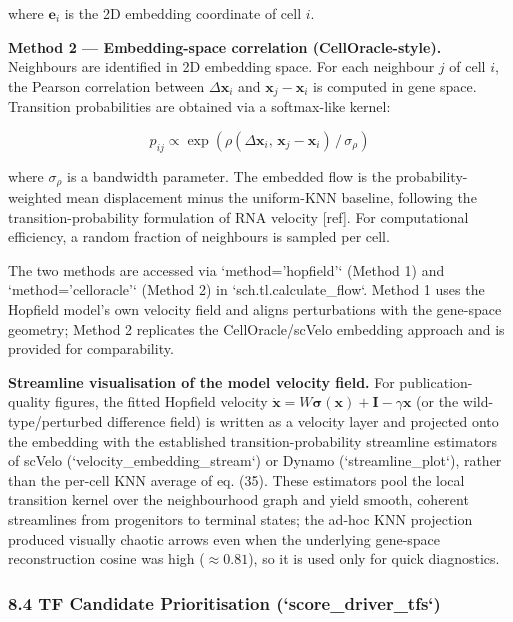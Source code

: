 \documentclass[11pt]{article}
\begin{document}
where $\mathbf{e}_i$ is the 2D embedding coordinate of cell $i$.

\textbf{Method 2 — Embedding-space correlation (CellOracle-style).} Neighbours are identified in 2D embedding space. For each neighbour $j$ of cell $i$, the Pearson correlation between $\Delta\mathbf{x}_i$ and $\mathbf{x}_j - \mathbf{x}_i$ is computed in gene space. Transition probabilities are obtained via a softmax-like kernel:

\begin{equation}
p_{ij} \propto \exp\!\left(\rho(\Delta\mathbf{x}_i,\, \mathbf{x}_j - \mathbf{x}_i) \,/\, \sigma_\rho\right)
\end{equation}

where $\sigma_\rho$ is a bandwidth parameter. The embedded flow is the probability-weighted mean displacement minus the uniform-KNN baseline, following the transition-probability formulation of RNA velocity [ref]. For computational efficiency, a random fraction of neighbours is sampled per cell.

The two methods are accessed via `method='hopfield'` (Method 1) and `method='celloracle'` (Method 2) in `sch.tl.calculate\_flow`. Method 1 uses the Hopfield model's own velocity field and aligns perturbations with the gene-space geometry; Method 2 replicates the CellOracle/scVelo embedding approach and is provided for comparability.

\textbf{Streamline visualisation of the model velocity field.} For publication-quality figures, the fitted Hopfield velocity $\dot{\mathbf{x}} = W\boldsymbol{\sigma}(\mathbf{x}) + \mathbf{I} - \gamma\mathbf{x}$ (or the wild-type/perturbed difference field) is written as a velocity layer and projected onto the embedding with the established transition-probability streamline estimators of scVelo (`velocity\_embedding\_stream`) or Dynamo (`streamline\_plot`), rather than the per-cell KNN average of eq. (35). These estimators pool the local transition kernel over the neighbourhood graph and yield smooth, coherent streamlines from progenitors to terminal states; the ad-hoc KNN projection produced visually chaotic arrows even when the underlying gene-space reconstruction cosine was high ($\approx 0.81$), so it is used only for quick diagnostics.


\subsubsection*{8.4 TF Candidate Prioritisation (`score\_driver\_tfs`)}
\end{document}
